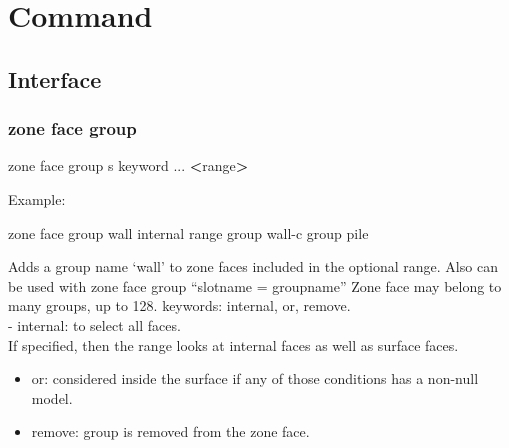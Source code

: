 \documentclass[a4paper, nobind]{templates/ociamthesis}
\newenvironment{Shaded}{\begin{snugshade}}{\end{snugshade}}
\newcommand{\BuiltInTok}[1]{#1}
\newcommand{\NormalTok}[1]{#1}
\newcommand{\OperatorTok}[1]{\textcolor[rgb]{0.81,0.36,0.00}{\textbf{#1}}}
\newcommand{\StringTok}[1]{\textcolor[rgb]{0.31,0.60,0.02}{#1}}
\renewenvironment{Shaded}
{
  \vspace{10pt}%
  \begin{snugshade}%
}{%
  \end{snugshade}%
  \vspace{8pt}%
}
\begin{document}
\hypertarget{command}{%
\chapter{Command}\label{command}}

\hypertarget{interface-2}{%
\section{Interface}\label{interface-2}}

\hypertarget{zone-face-group}{%
\subsection{zone face group}\label{zone-face-group}}

\begin{Shaded}
\begin{Highlighting}[]
\NormalTok{zone face group s keyword ... }\OperatorTok{\textless{}}\BuiltInTok{range}\OperatorTok{\textgreater{}} 
\end{Highlighting}
\end{Shaded}

Example:

\begin{Shaded}
\begin{Highlighting}[]
\NormalTok{zone face group }\StringTok{\textquotesingle{}wall\textquotesingle{}}\NormalTok{ internal }\BuiltInTok{range}\NormalTok{ group }\StringTok{\textquotesingle{}wall{-}c\textquotesingle{}}\NormalTok{ group }\StringTok{\textquotesingle{}pile\textquotesingle{}}
\end{Highlighting}
\end{Shaded}

Adds a group name `wall' to zone faces included in the optional range.
Also can be used with zone face group ``slotname = groupname'' Zone face
may belong to many groups, up to 128. keywords: internal, or, remove.\\
- internal: to select all faces.\\
If specified, then the range looks at internal faces as well as surface
faces.

\begin{itemize}
\item
  or: considered inside the surface if any of those conditions has a
  non-null model.
\item
  remove: group is removed from the zone face.
\end{itemize}
\end{document}
